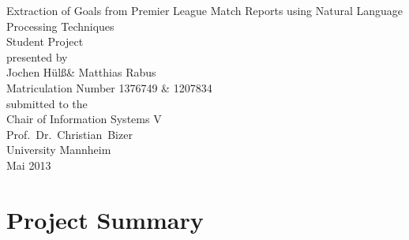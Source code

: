 \documentclass[11pt,titlepage,oneside,openany]{book}
\begin{document}
\begin{titlepage}
	\vspace*{2cm}
  \begin{center}
   {\Large Extraction of Goals from Premier League Match Reports using Natural Language Processing Techniques\\}
   \vspace{2cm} 
   {Student  Project\\}
   \vspace{2cm}
   {presented by\\
    Jochen H\"{u}l\ss \xspace  \&  Matthias Rabus \\
    Matriculation Number 1376749 \& 1207834 \\
   }
   \vspace{1cm} 
   {submitted to the\\
    Chair of Information Systems V\\
    Prof.\ Dr.\ Christian\ Bizer\\
    University Mannheim\\} \vspace{2cm}
   {Mai 2013}
  \end{center}
\end{titlepage} 

\tableofcontents
\newpage




\newpage



\chapter{Project Summary}
\end{document}
